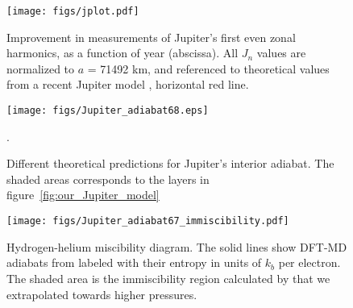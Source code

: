 




%
%
%
%
%
%
%

\begin{figure}[h]
  \begin{center}
    \noindent\texttt{[image: figs/jplot.pdf]}
  \end{center}
\caption{Improvement in measurements of Jupiter's first even zonal harmonics, as a function of year
(abscissa).  All $J_n$ values are normalized to $a$ = 71492 km, and referenced to theoretical
values from a recent Jupiter model \citep{HM16}, horizontal red line. }
\label{fig:jplot}
\end{figure}



\begin{figure}[h]
  \begin{center}
    \noindent\texttt{[image: figs/Jupiter\_adiabat68.eps]}
  \end{center}
  \caption{Different theoretical predictions for Jupiter's interior adiabat. The shaded areas corresponds to the layers
    in figure~\ref{fig:our_Jupiter_model}}. 
  \label{fig:jup}
\end{figure}

\begin{figure}[h]
  \begin{center}
    \noindent\texttt{[image: figs/Jupiter\_adiabat67\_immiscibility.pdf]}
  \end{center}
  \caption{Hydrogen-helium miscibility diagram. The solid lines show
    DFT-MD adiabats from \citet{MH13} labeled with their entropy in
    units of $k_b$ per electron. The shaded area is the immiscibility
    region calculated by \citet{Morales2013} that we extrapolated
    towards higher pressures. }
  \label{fig:imm}
\end{figure}

